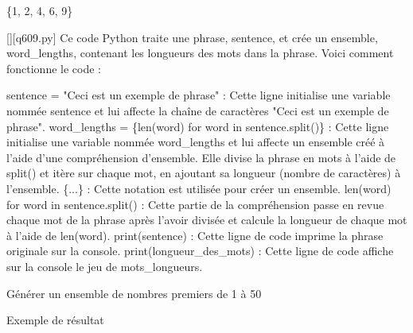 \{1, 2, 4, 6, 9\}
        \par
        \begin{solution}
            \renewcommand{\nomfichier}{q609.py}
            \pythonfile{\chemincode \nomfichier}[][\nomfichier]
            Ce code Python traite une phrase, sentence, et crée un ensemble, word\_lengths, contenant les longueurs des mots dans la phrase. Voici comment fonctionne le code :

    sentence = "Ceci est un exemple de phrase" : Cette ligne initialise une variable nommée sentence et lui affecte la chaîne de caractères "Ceci est un exemple de phrase".
    word\_lengths = \{len(word) for word in sentence.split()\} : Cette ligne initialise une variable nommée word\_lengths et lui affecte un ensemble créé à l'aide d'une compréhension d'ensemble. Elle divise la phrase en mots à l'aide de split() et itère sur chaque mot, en ajoutant sa longueur (nombre de caractères) à l'ensemble.
        \{...\} : Cette notation est utilisée pour créer un ensemble.
        len(word) for word in sentence.split() : Cette partie de la compréhension passe en revue chaque mot de la phrase après l'avoir divisée et calcule la longueur de chaque mot à l'aide de len(word).
    print(sentence) : Cette ligne de code imprime la phrase originale sur la console.
    print(longueur\_des\_mots) : Cette ligne de code affiche sur la console le jeu de mots\_longueurs.
        \end{solution}
        

        \question
        Générer un ensemble de nombres premiers de 1 à 50

Exemple de résultat


